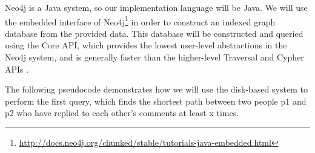 \documentclass{article}
\begin{document}

Neo4j is a Java system, so our implementation language will be Java.
We will use the embedded interface of
Neo4j\footnote{\url{http://docs.neo4j.org/chunked/stable/tutorials-java-embedded.html}}
in order to construct an indexed graph database from the provided
data.  This database will be constructed and queried using the Core
API, which provides the lowest user-level abstractions in the Neo4j
system, and is generally faster than the higher-level Traversal and
Cypher APIs \cite[Chapter~6]{IanRobinson:2013ul}.

The following pseudocode demonstrates how we will use the disk-based
system to perform the first query, which finds the shortest path
between two people p1 and p2 who have replied to each other's comments
at least x times.
\end{document}
